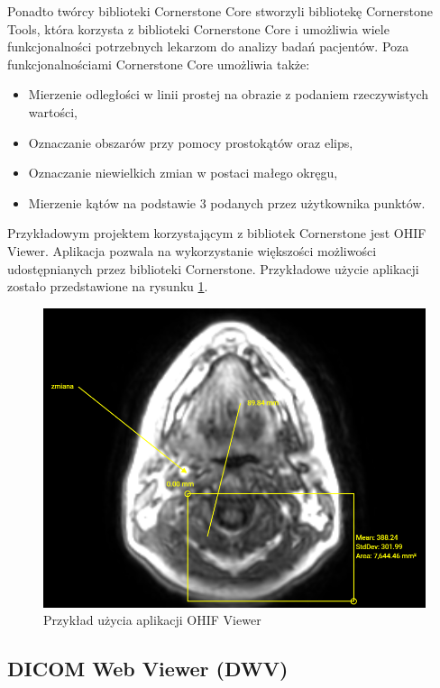 \documentclass[a4paper,11pt,twoside,openright]{report}
\theoremstyle{definition}
\begin{document}
Ponadto twórcy biblioteki Cornerstone Core stworzyli bibliotekę Cornerstone Tools, która korzysta z biblioteki Cornerstone Core i umożliwia wiele funkcjonalności potrzebnych lekarzom do analizy badań pacjentów. Poza funkcjonalnościami Cornerstone Core umożliwia także:

\begin{itemize}[noitemsep]
\item Mierzenie odległości w linii prostej na obrazie z podaniem rzeczywistych wartości,
\item Oznaczanie obszarów przy pomocy prostokątów oraz elips,
\item Oznaczanie niewielkich zmian w postaci małego okręgu,
\item Mierzenie kątów na podstawie 3 podanych przez użytkownika punktów.
\end{itemize}

Przykładowym projektem korzystającym z bibliotek Cornerstone jest OHIF Viewer. Aplikacja pozwala na wykorzystanie większości możliwości udostępnianych przez biblioteki Cornerstone. Przykładowe użycie aplikacji zostało przedstawione na rysunku \ref{fig:OHIF-example}.

\begin{figure}[t]
	\includegraphics[width=\textwidth]{OHIF-example}
	\caption{Przykład użycia aplikacji OHIF Viewer}
    	\label{fig:OHIF-example}
\end{figure}

\subsection {DICOM Web Viewer (DWV)}
\end{document}
